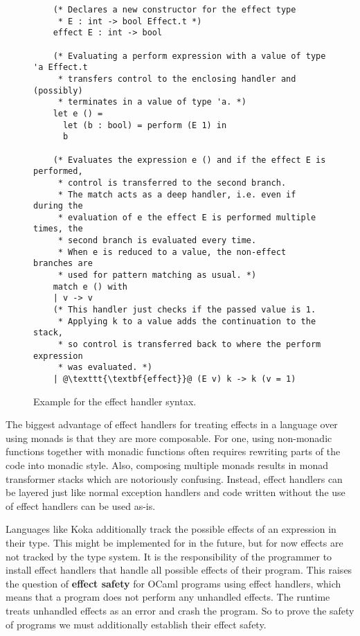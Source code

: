 \begin{figure}[ht]
  \begin{verbatim}
    (* Declares a new constructor for the effect type 
     * E : int -> bool Effect.t *)
    effect E : int -> bool

    (* Evaluating a perform expression with a value of type 'a Effect.t 
     * transfers control to the enclosing handler and (possibly)
     * terminates in a value of type 'a. *)
    let e () = 
      let (b : bool) = perform (E 1) in
      b

    (* Evaluates the expression e () and if the effect E is performed,
     * control is transferred to the second branch.
     * The match acts as a deep handler, i.e. even if during the 
     * evaluation of e the effect E is performed multiple times, the
     * second branch is evaluated every time.
     * When e is reduced to a value, the non-effect branches are 
     * used for pattern matching as usual. *)
    match e () with
    | v -> v
    (* This handler just checks if the passed value is 1.
     * Applying k to a value adds the continuation to the stack,
     * so control is transferred back to where the perform expression 
     * was evaluated. *)
    | @\texttt{\textbf{effect}}@ (E v) k -> k (v = 1)
\end{verbatim}
  \caption{Example for the effect handler syntax.}
  \label{fig:effect-example}
\end{figure}

The biggest advantage of effect handlers for treating effects in a language over using monads is that they are more composable.
For one, using non-monadic functions together with monadic functions often requires rewriting parts of the code into monadic style.
Also, composing multiple monads results in monad transformer stacks which are notoriously confusing.
Instead, effect handlers can be layered just like normal exception handlers and code written without the use of effect handlers can be used as-is.

Languages like Koka additionally track the possible effects of an expression in their type.
This might be implemented for \ocf{} in the future, but for now effects are not tracked by the type system.
It is the responsibility of the programmer to install effect handlers that handle all possible effects of their program.
This raises the question of \textbf{effect safety} for OCaml programs using effect handlers, which means that a program does not perform any unhandled effects.
The \ocf{} runtime treats unhandled effects as an error and crash the program.
So to prove the safety of \ocf{} programs we must additionally establish their effect safety.

